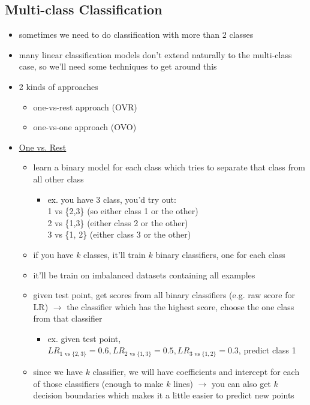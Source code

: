 \documentclass[10.5pt,a4paper, fleqn, dvipsnames]{article}
\begin{document}
\subsection*{Multi-class Classification}
\begin{itemize}
    \item sometimes we need to do classification with more than 2 classes 
    \item many linear classification models don't extend naturally to the multi-class case, so we'll need some techniques to get around this 
    \item 2 kinds of approaches
    \begin{itemize}
        \item one-vs-rest approach (OVR)
        \item one-vs-one approach (OVO) 
    \end{itemize}
    \item \ul{One vs. Rest}
    \begin{itemize}
        \item learn a binary model for each class which tries to separate that class from all other class 
        \begin{itemize}[leftmargin = 2em]
            \item ex. you have 3 class, you'd try out: \\
            1 vs \{2,3\} (so either class 1 or the other)\\
            2 vs \{1,3\} (either class 2 or the other)\\
            3 vs \{1, 2\} (either class 3 or the other)
        \end{itemize}
        \item if you have $k$ classes, it'll train $k$ binary classifiers, one for each class
        \item it'll be train on imbalanced datasets containing all examples
        \item given test point, get scores from all binary classifiers (e.g. raw score for LR) $\rightarrow$ the classifier which has the highest score, choose the one class from that classifier 
        \begin{itemize}[leftmargin = 2em]
            \item ex. given test point, $LR_{1 \text{ vs } \{2,3\}} = 0.6, LR_{2 \text{ vs } \{1,3\}} = 0.5, LR_{3 \text{ vs } \{1,2\}} = 0.3$, predict class 1
        \end{itemize}
        \item since we have $k$ classifier, we will have coefficients and intercept for each of those classifiers (enough to make $k$ lines) $\rightarrow$ you can also get $k$ decision boundaries which makes it a little easier to predict new points

\end{itemize}
\end{itemize}
\end{document}
